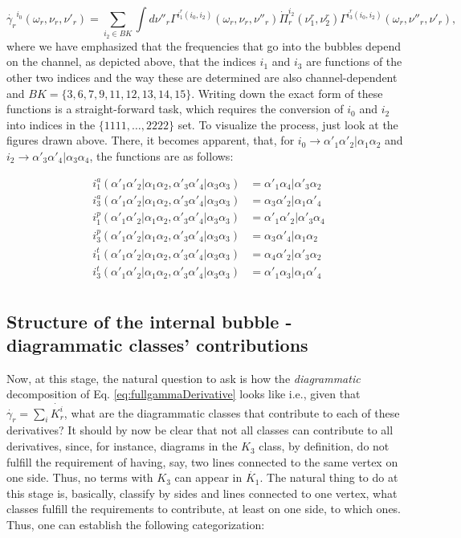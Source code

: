 \documentclass[12pt,a4paper,roman]{article}
\begin{document}
\begin{equation}
\dot{\gamma_r}^{i_0}(\omega_r, \nu_r, \nu'_r) = \sum_{i_2\in BK} \int d\nu''_r \Gamma^{i^r_1(i_0, i_2)}(\omega_r, \nu_r, \nu''_r)  \dot{\Pi}_r^{i_2}(\nu_1^r, \nu_2^r)  \Gamma^{i^r_3(i_0, i_2)}(\omega_r, \nu''_r, \nu'_r),
\label{eq:fullgammaDerivative}
\end{equation}
where we have emphasized that the frequencies that go into the bubbles depend on the channel, as depicted above, that the indices $i_1$ and $i_3$ are functions of the other two indices and the way these are determined are also channel-dependent and $BK = \{3, 6, 7, 9, 11, 12, 13, 14, 15\}$.
Writing down the exact form of these functions is a straight-forward task, which requires the conversion of $i_0$ and $i_2$ into indices in the $\{1111, \dots, 2222\}$ set. To visualize the process, just look at the figures drawn above. There, it becomes apparent, that, for $i_0 \rightarrow \alpha'_1\alpha'_2|\alpha_1\alpha_2$ and $i_2 \rightarrow \alpha'_3\alpha'_4|\alpha_3\alpha_4$, the functions are as follows:

\begin{align}
i_1^a (\alpha'_1\alpha'_2|\alpha_1\alpha_2, \alpha'_3\alpha'_4|\alpha_3\alpha_3) &= \alpha'_1\alpha_4| \alpha'_3\alpha_2 \\
i_3^a (\alpha'_1\alpha'_2|\alpha_1\alpha_2, \alpha'_3\alpha'_4|\alpha_3\alpha_3) &= \alpha_3\alpha'_2| \alpha_1\alpha'_4 \\
i_1^p (\alpha'_1\alpha'_2|\alpha_1\alpha_2, \alpha'_3\alpha'_4|\alpha_3\alpha_3) &= \alpha'_1\alpha'_2| \alpha'_3\alpha_4 \\
i_3^p (\alpha'_1\alpha'_2|\alpha_1\alpha_2, \alpha'_3\alpha'_4|\alpha_3\alpha_3) &= \alpha_3\alpha'_4| \alpha_1\alpha_2 \\
i_1^t (\alpha'_1\alpha'_2|\alpha_1\alpha_2, \alpha'_3\alpha'_4|\alpha_3\alpha_3) &= \alpha_4\alpha'_2| \alpha'_3\alpha_2 \\
i_3^t (\alpha'_1\alpha'_2|\alpha_1\alpha_2, \alpha'_3\alpha'_4|\alpha_3\alpha_3) &= \alpha'_1\alpha_3| \alpha_1\alpha'_4 \\
\end{align}
\subsection*{Structure of the internal bubble - diagrammatic classes' contributions}
Now, at this stage, the natural question to ask is how the \textit{diagrammatic} decomposition of Eq. \ref{eq:fullgammaDerivative} looks like i.e., given that $\dot{\gamma_r} = \sum_i \dot{K_r^i}$, what are the diagrammatic classes that contribute to each of these derivatives? It should by now be clear that not all classes can contribute to all derivatives, since, for instance, diagrams in the $K_3$ class, by definition, do not fulfill the requirement of having, say, two lines connected to the same vertex on one side. Thus, no terms with $K_3$ can appear in $\dot{K_1}$.
The natural thing to do at this stage is, basically, classify by sides and lines connected to one vertex, what classes fulfill the requirements to contribute, at least on one side, to which ones.
Thus, one can establish the following categorization:
\end{document}
